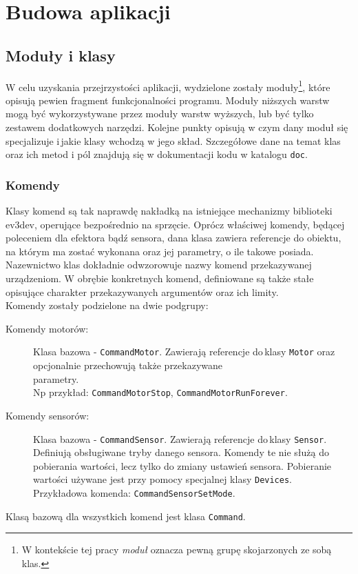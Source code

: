 \chapter{Budowa aplikacji}
\label{ch:budowa_aplikacji}

\section{Moduły i klasy}
\indent \indent W celu uzyskania przejrzystości aplikacji, wydzielone zostały moduły\footnote{W kontekście tej pracy \textit{moduł} oznacza pewną grupę skojarzonych ze sobą klas.}, które opisują pewien fragment funkcjonalności programu. Moduły niższych warstw mogą być wykorzystywane przez moduły warstw wyższych, lub być tylko zestawem dodatkowych narzędzi. Kolejne punkty opisują w czym dany moduł się specjalizuje i\,jakie klasy wchodzą w jego skład. Szczegółowe dane na temat klas oraz ich metod i pól znajdują się w dokumentacji kodu w katalogu {\tt doc}.

\subsection{Komendy}
\indent \indent Klasy komend są tak naprawdę nakładką na istniejące mechanizmy biblioteki ev3dev, operujące bezpośrednio na sprzęcie. Oprócz właściwej komendy, będącej poleceniem dla efektora bądź sensora, dana klasa zawiera referencje do obiektu, na którym ma zostać wykonana oraz jej parametry, o ile takowe posiada. Nazewnictwo klas dokładnie odwzorowuje nazwy komend przekazywanej urządzeniom. W obrębie konkretnych komend, definiowane są także stałe opisujące charakter przekazywanych argumentów oraz ich limity.\\
Komendy zostały podzielone na dwie podgrupy:
\begin{description}
    \item[Komendy motorów:] Klasa bazowa - {\tt CommandMotor}. Zawierają referencje do\,klasy {\tt Motor} oraz opcjonalnie przechowują także przekazywane\\parametry. \\Np przykład: {\tt CommandMotorStop}, {\tt CommandMotorRunForever}.

    \item[Komendy sensorów:] Klasa bazowa - {\tt CommandSensor}. Zawierają referencje do\,klasy {\tt Sensor}. Definiują obsługiwane tryby danego sensora. Komendy te nie służą do pobierania wartości, lecz tylko do zmiany ustawień sensora. Pobieranie wartości używane jest przy pomocy specjalnej klasy {\tt Devices}. \\Przykładowa komenda: {\tt CommandSensorSetMode}.
\end{description}
Klasą bazową dla wszystkich komend jest klasa {\tt Command}.

